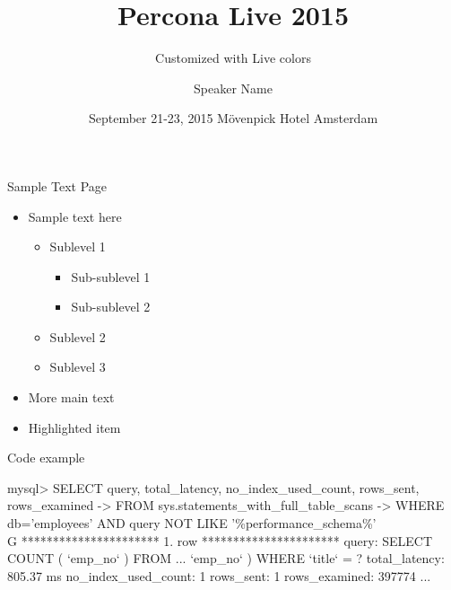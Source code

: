 \documentclass[aspectratio=169]{beamer}
\title[Percona Live Template HD]{Percona Live 2015}
\subtitle{Customized with Live colors}
\author{Speaker Name}
\date{September 21-23, 2015 Mövenpick Hotel  Amsterdam}
\begin{document}
        \begin{frame}
                \titlepage
        \end{frame}



        \begin{frame}{Sample Text Page}
                \begin{itemize}
                        \item Sample text here
                        \begin{itemize}
                                \item Sublevel 1
                                \begin{itemize}
                                	\item Sub-sublevel 1
                                	\item Sub-sublevel 2
                                \end{itemize}
                                \item Sublevel 2
                                \item Sublevel 3
                        \end{itemize}
                        \item More main text
                        \item \alert{Highlighted item}
                \end{itemize}
        \end{frame}
		
		\begin{frame}[fragile]{Code example}
			\begin{semiverbatim}
				mysql> SELECT query, total_latency, no_index_used_count, rows_sent, rows_examined
				    -> FROM sys.statements_with_full_table_scans 
				    -> WHERE db='employees' AND query NOT LIKE '\%performance_schema\%'\\G
				********************** 1. row **********************
				              query: SELECT COUNT ( `emp_no` ) FROM ...  `emp_no` ) WHERE `title` = ?
				      total_latency: 805.37 ms
				no_index_used_count: 1
				          rows_sent: 1
				      rows_examined: 397774
				...
			\end{semiverbatim}
		\end{frame}
		
\end{document}
